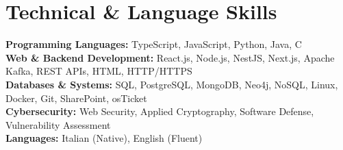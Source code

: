 \section{Technical \& Language Skills}
\vspace{2pt}
\noindent\small
\textbf{Programming Languages: } TypeScript, JavaScript, Python, Java, C\\[2pt]
\textbf{Web \& Backend Development: } React.js, Node.js, NestJS, Next.js, Apache Kafka, REST APIs, HTML, HTTP/HTTPS\\[2pt]
\textbf{Databases \& Systems: } SQL, PostgreSQL, MongoDB, Neo4j, NoSQL, Linux, Docker, Git, SharePoint, osTicket\\[2pt]
\textbf{Cybersecurity: } Web Security, Applied Cryptography, Software Defense, Vulnerability Assessment\\[2pt]
\textbf{Languages: } Italian (Native), English (Fluent)
